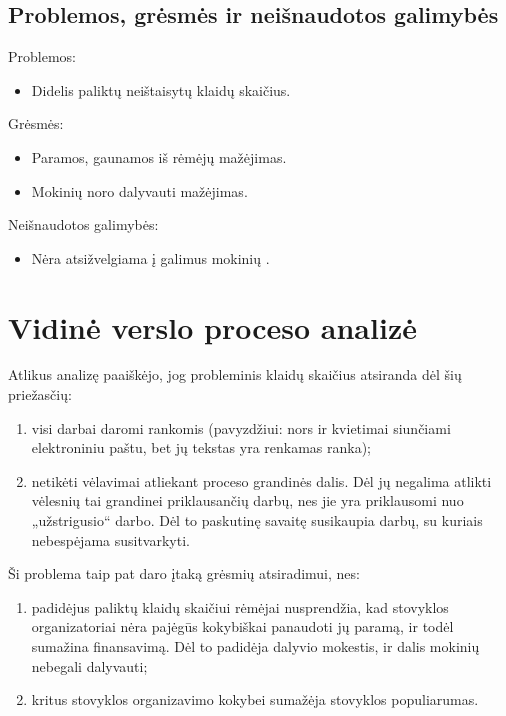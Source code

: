 \subsection{Problemos, grėsmės ir neišnaudotos galimybės}

Problemos:
\begin{itemize}
  \item Didelis paliktų neištaisytų klaidų skaičius.
\end{itemize}

Grėsmės:
\begin{itemize}
  \item Paramos, gaunamos iš rėmėjų mažėjimas. 
  \item Mokinių noro dalyvauti mažėjimas.
\end{itemize}

Neišnaudotos galimybės:
\begin{itemize}
  \item Nėra atsižvelgiama į galimus mokinių \glsspecporeikdgsg.
\end{itemize}

\section{Vidinė verslo proceso analizė}

Atlikus analizę paaiškėjo, jog probleminis klaidų skaičius atsiranda dėl
šių priežasčių:
\begin{enumerate}
  \item visi darbai daromi rankomis (pavyzdžiui: nors ir kvietimai
    siunčiami elektroniniu paštu, bet jų tekstas yra renkamas ranka);
  \item netikėti vėlavimai atliekant proceso grandinės dalis. Dėl jų 
    negalima atlikti vėlesnių tai grandinei priklausančių darbų, nes
    jie yra priklausomi nuo „užstrigusio“ darbo. Dėl to paskutinę 
    savaitę susikaupia darbų, su kuriais nebespėjama susitvarkyti.
\end{enumerate}

Ši problema taip pat daro įtaką grėsmių atsiradimui, nes:
\begin{enumerate}
  \item padidėjus paliktų klaidų skaičiui rėmėjai nusprendžia, kad 
    stovyklos organizatoriai nėra pajėgūs kokybiškai panaudoti jų paramą,
    ir todėl sumažina finansavimą. Dėl to padidėja dalyvio mokestis, ir
    dalis mokinių nebegali dalyvauti;
  \item kritus stovyklos organizavimo kokybei sumažėja stovyklos
    populiarumas.
\end{enumerate}

